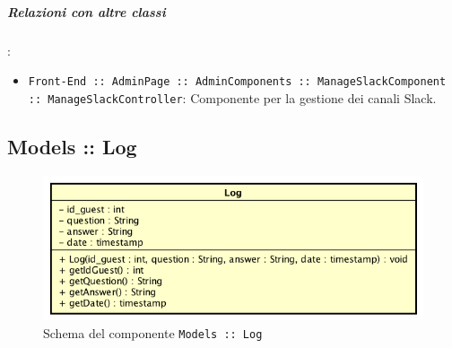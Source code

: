 \documentclass[../ManualeSviluppatore_v2.0.0.tex]{subfiles}
\begin{document}
			\subparagraph{Relazioni con altre classi}:
			\begin{itemize}
				\item \texttt{Front-End :: AdminPage :: AdminComponents :: ManageSlackComponent :: ManageSlackController}: Componente per la gestione dei canali Slack.
			\end{itemize}


	\newpage
	\subsection{Models :: Log}
	\begin{figure}[!h]
		\centering
		\includegraphics[scale=0.6]{Architettura/Front-End/Models/Log.png}
		\caption{Schema del componente \texttt{Models :: Log}}
	\end{figure}
\end{document}
